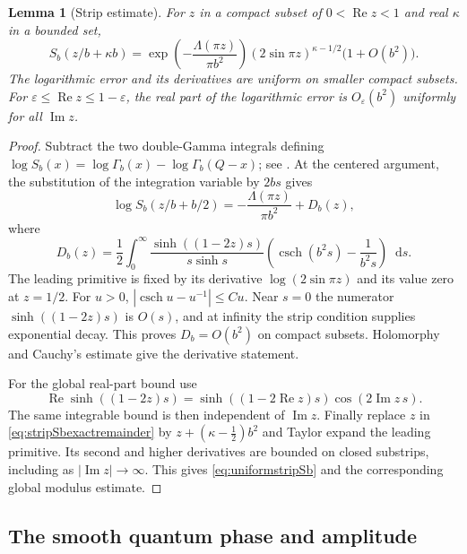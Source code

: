 \documentclass[11pt,a4paper]{article}
\numberwithin{equation}{section}
\newtheorem{lemma}[theorem]{Lemma}
\theoremstyle{definition}
\theoremstyle{remark}
\newcommand{\dd}{\mathop{}\!\mathrm d}
\begin{document}
\begin{lemma}[Strip estimate]
\label{lem:stripdoubleSine}
For $z$ in a compact subset of $0<\operatorname{Re}z<1$ and
real $\kappa$ in a bounded set,
\begin{equation}
 S_b(z/b+\kappa b)
 =
 \exp\!\left(-\frac{\Lambda(\pi z)}{\pi b^2}\right)
 (2\sin\pi z)^{\kappa-1/2}
 \bigl(1+O(b^2)\bigr).
 \label{eq:uniformstripSb}
\end{equation}
The logarithmic error and its derivatives are uniform on
smaller compact subsets. For
$\varepsilon\le\operatorname{Re}z\le1-\varepsilon$,
the real part of the logarithmic error is $O_\varepsilon(b^2)$
uniformly for all $\operatorname{Im}z$.
\end{lemma}

\begin{proof}
Subtract the two double-Gamma integrals defining
$\log S_b(x)=\log\Gamma_b(x)-\log\Gamma_b(Q-x)$; see
\cite[Appendix~A]{TeschnerVartanov}. At the centered argument,
the substitution of the integration variable by $2bs$ gives
\begin{equation}
 \log S_b(z/b+b/2)
 =-\frac{\Lambda(\pi z)}{\pi b^2}+D_b(z),
 \label{eq:stripSbexactremainder}
\end{equation}
where
\begin{equation}
 D_b(z)=\frac12\int_0^\infty
 \frac{\sinh((1-2z)s)}{s\sinh s}
 \left(\operatorname{csch}(b^2s)-\frac1{b^2s}\right)\dd s.
 \label{eq:Sbremainderintegral}
\end{equation}
The leading primitive is fixed by its derivative
$\log(2\sin\pi z)$ and its value zero at $z=1/2$.
For $u>0$,
$|\operatorname{csch}u-u^{-1}|\le C u$.
Near $s=0$ the numerator $\sinh((1-2z)s)$ is $O(s)$,
and at infinity the strip condition supplies exponential decay.
This proves $D_b=O(b^2)$ on compact subsets. Holomorphy and
Cauchy's estimate give the derivative statement.

For the global real-part bound use
\[
 \operatorname{Re}\sinh((1-2z)s)
 =\sinh((1-2\operatorname{Re}z)s)
       \cos(2\operatorname{Im}z\,s).
 \]
The same integrable bound is then independent of
$\operatorname{Im}z$. Finally replace $z$ in
\eqref{eq:stripSbexactremainder} by
$z+(\kappa-\frac12)b^2$ and Taylor expand the leading
primitive. Its second and higher derivatives are bounded on
closed substrips, including as $|\operatorname{Im}z|\to\infty$.
This gives \eqref{eq:uniformstripSb} and the corresponding
global modulus estimate.
\end{proof}

\subsection{The smooth quantum phase and amplitude}
\end{document}
